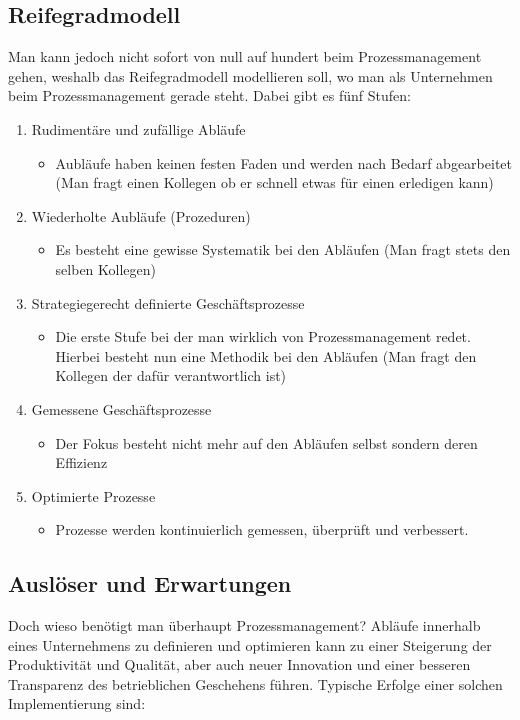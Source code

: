 \documentclass{article}
\begin{document}
  \subsection{Reifegradmodell}
  Man kann jedoch nicht sofort von null auf hundert beim Prozessmanagement gehen, weshalb das Reifegradmodell modellieren soll, wo man als Unternehmen beim Prozessmanagement gerade steht. Dabei gibt es fünf Stufen:
  \begin{enumerate}
    \item{Rudimentäre und zufällige Abläufe}
    \begin{itemize}
      \item{Aubläufe haben keinen festen Faden und werden nach Bedarf abgearbeitet (Man fragt einen Kollegen ob er schnell etwas für einen erledigen kann)}
    \end{itemize}
    \item{Wiederholte Aubläufe (Prozeduren)}
    \begin{itemize}
      \item{Es besteht eine gewisse Systematik bei den Abläufen (Man fragt stets den selben Kollegen)}
    \end{itemize}
    \item{Strategiegerecht definierte Geschäftsprozesse}
    \begin{itemize}
      \item{Die erste Stufe bei der man wirklich von Prozessmanagement redet. Hierbei besteht nun eine Methodik bei den Abläufen (Man fragt den Kollegen der dafür verantwortlich ist)}
    \end{itemize}
    \item{Gemessene Geschäftsprozesse}
    \begin{itemize}
      \item{Der Fokus besteht nicht mehr auf den Abläufen selbst sondern deren Effizienz}
    \end{itemize}
    \item{Optimierte Prozesse}
    \begin{itemize}
      \item{Prozesse werden kontinuierlich gemessen, überprüft und verbessert.}
    \end{itemize}
  \end{enumerate}
  \subsection{Auslöser und Erwartungen}
  Doch wieso benötigt man überhaupt Prozessmanagement? Abläufe innerhalb eines Unternehmens zu definieren und optimieren kann zu einer Steigerung der Produktivität und Qualität, aber auch neuer Innovation und einer besseren Transparenz des betrieblichen Geschehens führen. Typische Erfolge einer solchen Implementierung sind:
\end{document}
